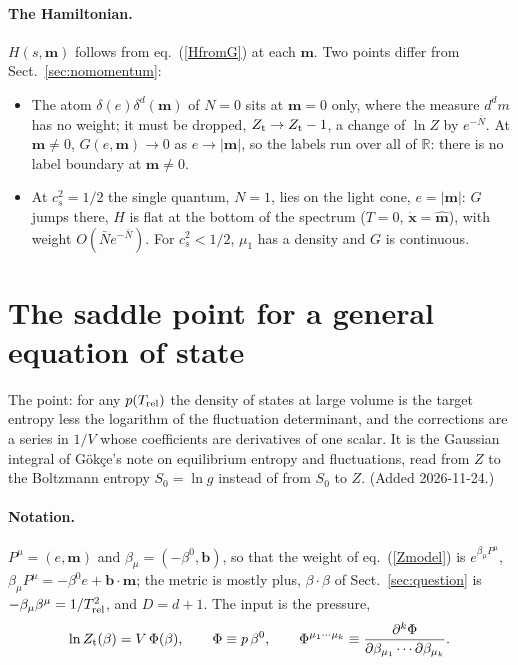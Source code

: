\documentclass[11pt,aps,preprint,nofootinbib,superscriptaddress,tightenlines]{revtex4-2}
\def\st{\begin{equation}}
\def\stp{\end{equation}}
\def\Eq#1{eq.~(\ref{#1})}
\def\Sect#1{Sect.~\ref{#1}}
\let\oldparagraph\paragraph
\renewcommand{\paragraph}{\par\bigskip\oldparagraph}
\begin{document}
\paragraph{The Hamiltonian.}  $H(s,\bm m)$ follows from \Eq{HfromG} at each $\bm m$.  Two points differ from \Sect{sec:nomomentum}:
\begin{itemize}
\item The atom $\delta(e)\delta^d(\bm m)$ of $N=0$ sits at $\bm m=0$ only, where the measure $d^dm$ has no weight; it must be dropped,
  $Z_{\rm t}\to Z_{\rm t}-1$, a change of $\ln Z$ by $e^{-\bar N}$.  At $\bm m\ne0$, $G(e,\bm m)\to0$ as $e\to|\bm m|$, so the labels run over
  all of $\mathbb R$: there is no label boundary at $\bm m\ne0$.
\item At $c_s^2=1/2$ the single quantum, $N=1$, lies on the light cone, $e=|\bm m|$: $G$ jumps there, $H$ is flat at the bottom of the spectrum
  ($T=0$, $\dot{\bm x}=\hat{\bm m}$), with weight $O(\bar Ne^{-\bar N})$.  For $c_s^2<1/2$, $\mu_1$ has a density and $G$ is continuous.
\end{itemize}

\section{The saddle point for a general equation of state}
\label{sec:saddle}

The point: for any $p(T_{\rm rel})$ the density of states at large volume is the target entropy less the logarithm of the fluctuation determinant,
and the corrections are a series in $1/V$ whose coefficients are derivatives of one scalar.  It is the Gaussian integral of G\"ok\c{c}e's note on
equilibrium entropy and fluctuations, read from $Z$ to the Boltzmann entropy $S_0=\ln g$ instead of from $S_0$ to $Z$.  (Added 2026-11-24.)

\paragraph{Notation.}  $P^\mu=(e,\bm m)$ and $\beta_\mu=(-\beta^0,\bm b)$, so that the weight of \Eq{Zmodel} is $e^{\beta_\mu P^\mu}$,
$\beta_\mu P^\mu=-\beta^0e+\bm b\cdot\bm m$; the metric is mostly plus, $\beta\cdot\beta$ of \Sect{sec:question} is $-\beta_\mu\beta^\mu=1/T_{\rm rel}^2$,
and $D=d+1$.  The input is the pressure,
\st
\ln Z_{\rm t}(\beta)=V\,\Phi(\beta),\qquad \Phi\equiv p\,\beta^0,\qquad
\Phi^{\mu_1\cdots\mu_k}\equiv\frac{\partial^k\Phi}{\partial\beta_{\mu_1}\cdots\partial\beta_{\mu_k}} .
\stp
\end{document}

